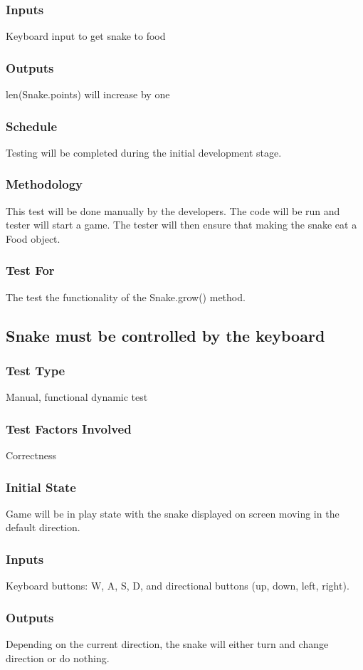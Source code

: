 \documentclass[12pt]{article}
\begin{document}
\subsubsection*{Inputs}
Keyboard input to get snake to food
\subsubsection*{Outputs}
len(Snake.points) will increase by one
\subsubsection*{Schedule}
Testing will be completed during the initial development stage.
\subsubsection*{Methodology}
This test will be done manually by the developers. The code will be run and tester will start a game. The tester will then ensure that making the snake eat a Food object.
\subsubsection*{Test For}
The test the functionality of the Snake.grow() method. \newline

\noindent
\subsection{Snake must be controlled by the keyboard}
\subsubsection*{Test Type}
Manual, functional dynamic test
\subsubsection*{Test Factors Involved}
Correctness
\subsubsection*{Initial State}
Game will be in play state with the snake displayed on screen moving in the default direction.
\subsubsection*{Inputs}
Keyboard buttons: W, A, S, D, and directional buttons (up, down, left, right). 
\subsubsection*{Outputs}
Depending on the current direction, the snake will either turn and change direction or do nothing.
\end{document}
